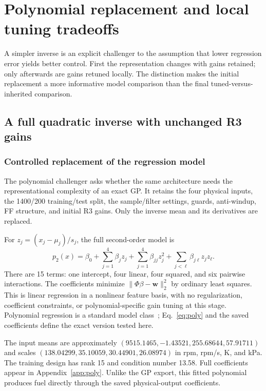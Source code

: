 \chapter{Polynomial replacement and local tuning tradeoffs}
\label{ch:poly}
A simpler inverse is an explicit challenger to the assumption that lower regression error yields better control. First the representation changes with gains retained; only afterwards are gains retuned locally. The distinction makes the initial replacement a more informative model comparison than the final tuned-versus-inherited comparison.

\section{A full quadratic inverse with unchanged R3 gains}
\subsection{Controlled replacement of the regression model}
The polynomial challenger asks whether the same architecture needs the representational complexity of an exact GP. It retains the four physical inputs, the 1400/200 training/test split, the sample/filter settings, guards, anti-windup, FF structure, and initial R3 gains. Only the inverse mean and its derivatives are replaced.

For $z_j=(x_j-\mu_j)/s_j$, the full second-order model is
\begin{equation}
p_2(x)=\beta_0+\sum_{j=1}^4\beta_jz_j+
\sum_{j=1}^4\beta_{jj}z_j^2+
\sum_{j<\ell}\beta_{j\ell}z_jz_\ell.
\label{eq:poly}
\end{equation}
There are 15 terms: one intercept, four linear, four squared, and six pairwise interactions. The coefficients minimize $\|\Phi\beta-\bm w\|_2^2$ by ordinary least squares. This is linear regression in a nonlinear feature basis, with no regularization, coefficient constraints, or polynomial-specific gain tuning at this stage. Polynomial regression is a standard model class~\cite{isl}; Eq.~\eqref{eq:poly} and the saved coefficients define the exact version tested here.


The input means are approximately $(9515.1465,-1.43521,255.68644,57.91711)$ and scales $(138.04299,35.10059,30.44901,26.08974)$ in rpm, rpm/s, K, and kPa. The training design has rank 15 and condition number 13.58. Full coefficients appear in Appendix~\ref{app:poly}. Unlike the GP export, this fitted polynomial produces fuel directly through the saved physical-output coefficients.

